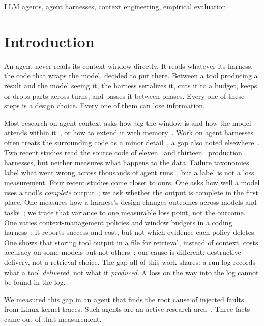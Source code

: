 \documentclass[10pt,conference]{IEEEtran}
\begin{document}
\begin{IEEEkeywords}
LLM agents, agent harnesses, context engineering, empirical evaluation
\end{IEEEkeywords}

\section{Introduction}
\label{sec:intro}

An agent never reads its context window directly. It reads whatever its
harness, the code that wraps the model, decided to put there. Between a
tool producing a result and the model seeing it, the harness serializes
it, cuts it to a budget, keeps or drops parts across turns, and passes it
between phases. Every one of these steps is a design choice. Every one of
them can lose information.

Most research on agent context asks how big the window is and how the
model attends within it~\cite{liu2024lost,hsieh2024ruler}, or how to extend it with
memory~\cite{packer2023memgpt}. Work on agent harnesses often treats the surrounding code as a minor
detail~\cite{yang2024sweagent,jimenez2024swebench}, a gap also noted
elsewhere~\cite{lindenbauer2025complexity}.
Two recent studies read the source code of eleven~\cite{harness2026} and
thirteen~\cite{rombaut2026scaffold} production harnesses, but neither
measures what happens to the data. Failure
taxonomies label what went wrong across thousands of agent
runs~\cite{cemri2025mast}, but a label is not a loss measurement. Four recent studies come closer to ours. One asks how well a model uses a
tool's \emph{complete} output~\cite{kate2026tooloutputs}; we ask whether
the output is complete in the first place. One measures how a harness's
design changes outcomes across models and
tasks~\cite{yao2026harnessbench}; we trace that variance to one measurable loss point, not the outcome.
One varies context-management policies and window budgets in a coding
harness~\cite{fan2026harnessdesign}; it reports success and cost, but not
which evidence each policy deletes. One shows that storing tool
output in a file for retrieval, instead of context, costs accuracy on
some models but not others~\cite{zhang2026samesimulation}; our cause is
different: destructive delivery, not a retrieval choice. The
gap all of this work shares: a run log records what a tool
\emph{delivered}, not what it \emph{produced}. A loss on the way into the
log cannot be found in the log.

We measured this gap in an agent that finds the root cause of injected
faults from Linux kernel traces. Such agents are an active research
area~\cite{chen2024rcacopilot,xu2025openrca}. Three facts came out of that
measurement.
\end{document}
